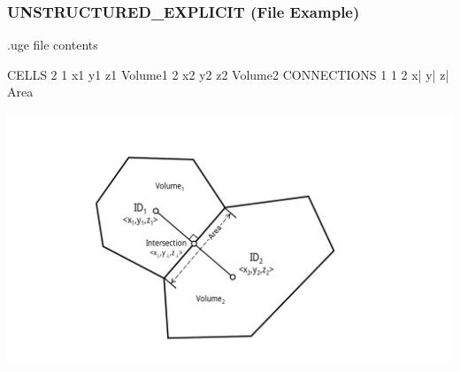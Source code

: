 \documentclass{beamer}
\begin{document}
\begin{frame}\frametitle{UNSTRUCTURED\_EXPLICIT (File Example)}

\begin{minipage}[t]{0.48\linewidth}
\vspace{0.4in}
.uge file contents
\begin{semiverbatim}
CELLS 2
1 x1 y1 z1 Volume1
2 x2 y2 z2 Volume2
CONNECTIONS 1
1 2 x| y| z| Area
\end{semiverbatim}
\end{minipage}
\hfill
\begin{minipage}[t]{0.48\linewidth}
\vspace{0.01in}
\hspace{-.5in}
\includegraphics[width=1.3\linewidth]{./voronoi_dual}
\end{minipage}

\end{frame}
\end{document}

